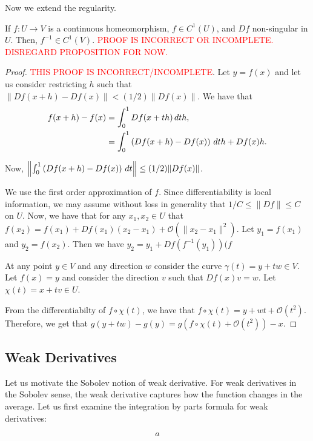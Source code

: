 Now we extend the regularity.

\begin{proposition}
If $f: U \to V$ is a continuous homeomorphism, $f\in C^1(U)$, and $Df$ non-singular in $U$. Then, $f^{-1}\in C^1(V)$.
\textcolor{red}{PROOF IS INCORRECT OR INCOMPLETE. DISREGARD PROPOSITION FOR NOW.}
\end{proposition}

\begin{proof}
\textcolor{red}{THIS PROOF IS INCORRECT/INCOMPLETE}.
Let $y = f(x)$ and let us consider restricting $h$ such that $\|Df(x+h)-Df(x)\|<(1/2)\|Df(x)\|$. We have that 
\begin{align}
f(x+h) - f(x) & = \int_0^1 Df(x+ th) \, dt h,\\
&  = \int_0^1 \left(Df(x+h) - Df(x)\right)\, dt h + Df(x)h.
\end{align}

Now, $\left\|\int_0^1 \left(Df(x+h) - Df(x)\right)\, dt\right\| \leq (1/2) \|Df(x)\|$.

We use the first order approximation of $f$. Since differentiability is local information, we may assume without loss in generality that $1/C \leq \|Df\| \leq C$ on $U$. Now, we have that for any $x_1, x_2 \in U$ that $f(x_2) = f(x_1) + Df(x_1) (x_2 - x_1) + \mathcal O(\|x_2 - x_1\|^2)$. Let $y_1 = f(x_1)$ and $y_2 = f(x_2)$. Then we have $y_2 = y_1 + Df(f^{-1}(y_1)) (f$

At any point $y\in V$ and any direction $w$ consider the curve $\gamma(t) = y + tw \in V$. Let $f(x) = y$ and consider the direction $v$ such that $Df(x)v = w$. Let $\chi(t) = x + tv \in U$.

From the differentiabilty of $f\circ \chi(t)$, we have that $f\circ \chi(t)  = y + wt + \mathcal O(t^2).$ Therefore, we get that $g(y+tw) - g(y) = g(f\circ\chi(t) + \mathcal O(t^2)) - x$.
\end{proof}


\subsection{Weak Derivatives}

Let us motivate the Sobolev notion of weak derivative. For weak derivatives in the Sobolev sense, the weak derivative captures how the function changes in the average. Let us first examine the integration by parts formula for weak derivatives:

\begin{equation}
a
\end{equation}
